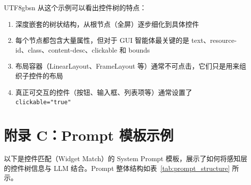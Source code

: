 \documentclass{article}
\begin{document}
\begin{CJK}{UTF8}{gbsn}
从这个示例可以看出控件树的特点：
\begin{enumerate}[leftmargin=1.5em]
  \item 深度嵌套的树状结构，从根节点（全屏）逐步细化到具体控件
  \item 每个节点都包含大量属性，但对于 GUI 智能体最关键的是 text、resource-id、class、content-desc、clickable 和 bounds
  \item 布局容器（LinearLayout、FrameLayout 等）通常不可点击，它们只是用来组织子控件的布局
  \item 真正可交互的控件（按钮、输入框、列表项等）通常设置了 \texttt{clickable="true"}
\end{enumerate}

\section*{附录 C：Prompt 模板示例}

以下是控件匹配（Widget Match）的 System Prompt 模板，展示了如何将感知层的控件树信息与 LLM 结合。Prompt 整体结构如表~\ref{tab:prompt_structure} 所示。


\end{CJK}
\end{document}
